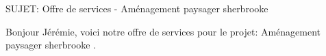 SUJET: Offre de services - Aménagement paysager sherbrooke \par Bonjour Jérémie, voici notre offre de services pour le projet: Aménagement paysager sherbrooke .